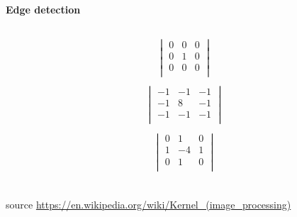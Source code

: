 \documentclass[xcolor=dvipsnames]{beamer}
\begin{document}
\begin{frame}{\bf Edge detection}
\begin{columns}
\begin{column}{0.5\textwidth}
  \scriptsize
  {
    \begin{align*}
    \begin{vmatrix}
        0 & 0 & 0 \\
        0 & 1 & 0 \\
        0 & 0 & 0 \\
    \end{vmatrix}\\
    \end{align*}
  }
  \scriptsize
  {
    \begin{align*}
    \begin{vmatrix}
        -1 & -1 & -1 \\
        -1 & 8 & -1 \\
        -1 & -1 & -1 \\
    \end{vmatrix}\\
    \end{align*}
  }
  \scriptsize
  {
    \begin{align*}
    \begin{vmatrix}
        0 & 1 & 0 \\
        1 & -4 & 1 \\
        0 & 1 & 0 \\
    \end{vmatrix}\\
    \end{align*}
  }
\end{column}
\end{columns}



{\tiny source \url{https://en.wikipedia.org/wiki/Kernel_(image_processing)}}

\end{frame}
\end{document}
